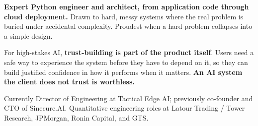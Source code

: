 \vspace{2pt}
{\raggedright
\textbf{Expert Python engineer and architect, from application code through cloud deployment.}
Drawn to hard, messy systems where the real problem is buried under accidental complexity.
Proudest when a hard problem collapses into a simple design.

\vspace{5pt}
For high-stakes AI, \textbf{trust-building is part of the product itself}.
Users need a safe way to experience the system before they have to depend on it, so they can
build justified confidence in how it performs when it matters.
\textbf{An AI system the client does not trust is worthless.}

\vspace{5pt}
Currently Director of Engineering at Tactical Edge AI; previously co-founder and CTO of Sinecure.AI.
Quantitative engineering roles at Latour Trading / Tower Research, JPMorgan, Ronin Capital, and GTS.
\par}
\vspace{6pt}
